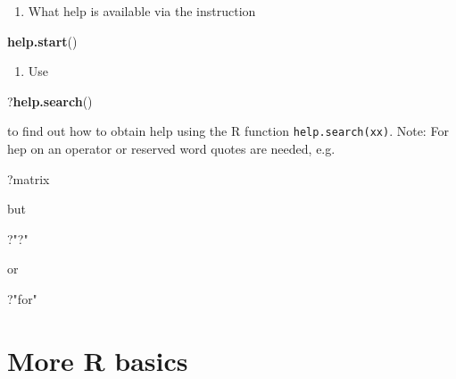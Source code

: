 \documentclass[
]{book}
\newenvironment{Shaded}{\begin{snugshade}}{\end{snugshade}}
\newcommand{\FunctionTok}[1]{\textcolor[rgb]{0.13,0.29,0.53}{\textbf{#1}}}
\newcommand{\NormalTok}[1]{#1}
\newcommand{\StringTok}[1]{\textcolor[rgb]{0.31,0.60,0.02}{#1}}
\providecommand{\tightlist}{%
  \setlength{\itemsep}{0pt}\setlength{\parskip}{0pt}}
\begin{document}
\begin{enumerate}
\def\labelenumi{(\alph{enumi})}
\setcounter{enumi}{2}
\tightlist
\item
  What help is available via the instruction
\end{enumerate}

\begin{Shaded}
\begin{Highlighting}[]
\FunctionTok{help.start}\NormalTok{()}
\end{Highlighting}
\end{Shaded}

\begin{enumerate}
\def\labelenumi{(\alph{enumi})}
\setcounter{enumi}{3}
\tightlist
\item
  Use
\end{enumerate}

\begin{Shaded}
\begin{Highlighting}[]
\NormalTok{?}\FunctionTok{help.search}\NormalTok{()}
\end{Highlighting}
\end{Shaded}

to find out how to obtain help using the R function \texttt{help.search(xx)}. Note: For hep on an operator or reserved word quotes are needed, e.g.

\begin{Shaded}
\begin{Highlighting}[]
\NormalTok{?matrix}
\end{Highlighting}
\end{Shaded}

but

\begin{Shaded}
\begin{Highlighting}[]
\NormalTok{?}\StringTok{"?"}
\end{Highlighting}
\end{Shaded}

or

\begin{Shaded}
\begin{Highlighting}[]
\NormalTok{?}\StringTok{"for"}
\end{Highlighting}
\end{Shaded}

\section{More R basics}\label{MoreBasics}
\end{document}
